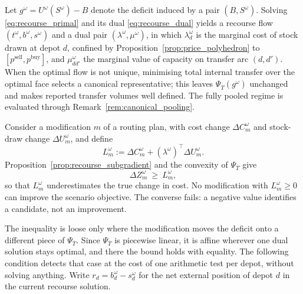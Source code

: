 \documentclass[authoryear,final,3p,times]{elsarticle}
\theoremstyle{definition}
\theoremstyle{plain}
\begin{document}
Let $g^\omega=U^\omega(S^\omega)-B$ denote the deficit induced by a pair
$(B,S^\omega)$. Solving \eqref{eq:recourse_primal} and its dual
\eqref{eq:recourse_dual} yields a recourse flow $(t^\omega,b^\omega,s^\omega)$
and a dual pair $(\lambda^\omega,\mu^\omega)$, in which $\lambda_d^\omega$ is
the marginal cost of stock drawn at depot $d$, confined by
Proposition~\ref{prop:price_polyhedron} to $[p^{\mathrm{sell}},p^{\mathrm{buy}}]$,
and $\mu_{dd'}^\omega$ the marginal value of capacity on transfer arc
$(d,d')$. When the optimal flow is not
unique, minimising total internal transfer over the optimal face selects a
canonical representative; this leaves $\Psi_{\overline T}(g^\omega)$ unchanged
and makes reported transfer volumes well defined. The fully pooled regime is
evaluated through Remark~\ref{rem:canonical_pooling}.

Consider a modification $m$ of a routing plan, with cost change
$\Delta C_m^\omega$ and stock-draw change $\Delta U_m^\omega$, and define
\begin{equation}
 L_m^\omega
 :=\Delta C_m^\omega+(\lambda^\omega)^\top\Delta U_m^\omega .
 \label{eq:move_lower_bound}
\end{equation}
Proposition~\ref{prop:recourse_subgradient} and the convexity of
$\Psi_{\overline T}$ give
\begin{equation}
 \Delta Z_m^\omega\ \ge\ L_m^\omega ,
 \label{eq:move_subgradient_bound}
\end{equation}
so that $L_m^\omega$ underestimates the true change in cost. No modification
with $L_m^\omega\ge0$ can improve the scenario objective. The converse fails:
a negative value identifies a candidate, not an improvement.

The inequality is loose only where the modification moves the deficit onto a
different piece of $\Psi_{\overline T}$. Since $\Psi_{\overline T}$ is
piecewise linear, it is affine wherever one dual solution stays optimal, and
there the bound holds with equality. The following condition detects that case
at the cost of one arithmetic test per depot, without solving anything. Write
$r_d=b_d^\omega-s_d^\omega$ for the net external position of depot $d$ in the
current recourse solution.
\end{document}
